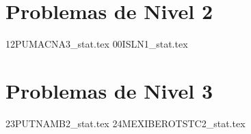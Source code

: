 \section{Problemas de Nivel 2}
{12PUMACNA3_stat.tex} %
{00ISLN1_stat.tex} %

\section{Problemas de Nivel 3}
{23PUTNAMB2_stat.tex} %
{24MEXIBEROTSTC2_stat.tex} %